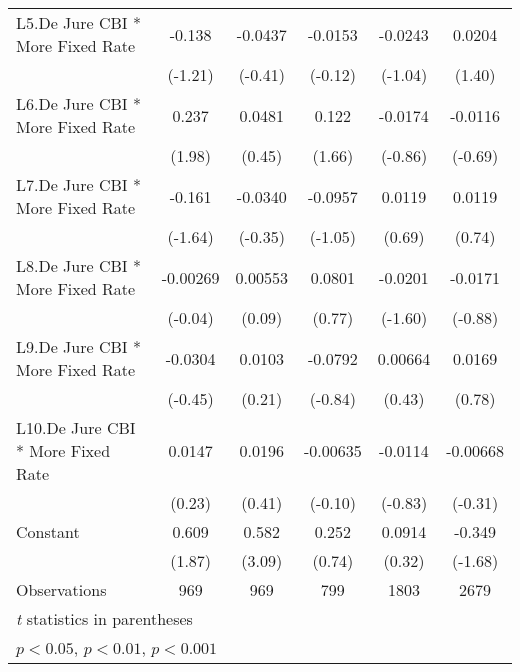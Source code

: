 \begin{table}[htbp]
\begin{tabular}{l*{5}{c}}
\addlinespace
L5.De Jure CBI * More Fixed Rate        &   -0.138         &  -0.0437         &  -0.0153         &  -0.0243         &   0.0204         \\
                                        &  (-1.21)         &  (-0.41)         &  (-0.12)         &  (-1.04)         &   (1.40)         \\
\addlinespace
L6.De Jure CBI * More Fixed Rate        &    0.237\sym{*}  &   0.0481         &    0.122         &  -0.0174         &  -0.0116         \\
                                        &   (1.98)         &   (0.45)         &   (1.66)         &  (-0.86)         &  (-0.69)         \\
\addlinespace
L7.De Jure CBI * More Fixed Rate        &   -0.161         &  -0.0340         &  -0.0957         &   0.0119         &   0.0119         \\
                                        &  (-1.64)         &  (-0.35)         &  (-1.05)         &   (0.69)         &   (0.74)         \\
\addlinespace
L8.De Jure CBI * More Fixed Rate        & -0.00269         &  0.00553         &   0.0801         &  -0.0201         &  -0.0171         \\
                                        &  (-0.04)         &   (0.09)         &   (0.77)         &  (-1.60)         &  (-0.88)         \\
\addlinespace
L9.De Jure CBI * More Fixed Rate        &  -0.0304         &   0.0103         &  -0.0792         &  0.00664         &   0.0169         \\
                                        &  (-0.45)         &   (0.21)         &  (-0.84)         &   (0.43)         &   (0.78)         \\
\addlinespace
L10.De Jure CBI * More Fixed Rate       &   0.0147         &   0.0196         & -0.00635         &  -0.0114         & -0.00668         \\
                                        &   (0.23)         &   (0.41)         &  (-0.10)         &  (-0.83)         &  (-0.31)         \\
\addlinespace
Constant                                &    0.609         &    0.582\sym{**} &    0.252         &   0.0914         &   -0.349         \\
                                        &   (1.87)         &   (3.09)         &   (0.74)         &   (0.32)         &  (-1.68)         \\
\midrule
Observations                            &      969         &      969         &      799         &     1803         &     2679         \\
\bottomrule
\multicolumn{6}{l}{\footnotesize \textit{t} statistics in parentheses}\\
\multicolumn{6}{l}{\footnotesize \sym{*} \(p<0.05\), \sym{**} \(p<0.01\), \sym{***} \(p<0.001\)}\\
\end{tabular}
\end{table}
